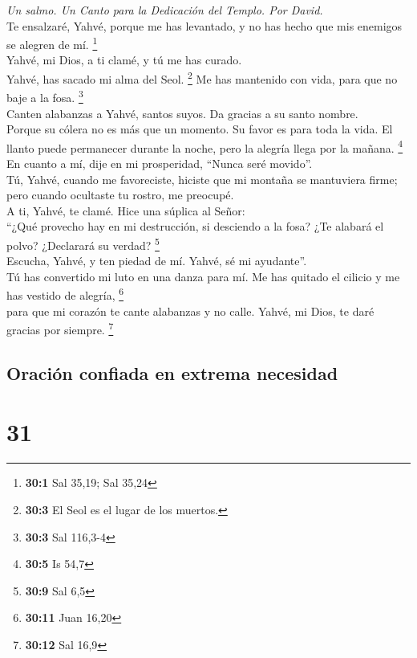 \emph{Un salmo. Un Canto para la Dedicación del Templo. Por David.}\\
 Te ensalzaré, Yahvé, porque me has levantado, y no has
hecho que mis enemigos se alegren de mí. \footnote{\textbf{30:1} Sal
  35,19; Sal 35,24}\\
 Yahvé, mi Dios, a ti clamé, y tú me has curado.\\
 Yahvé, has sacado mi alma del Seol. \footnote{\textbf{30:3}
  El Seol es el lugar de los muertos.} Me has mantenido con vida, para
que no baje a la fosa. \footnote{\textbf{30:3} Sal 116,3-4}\\
 Canten alabanzas a Yahvé, santos suyos. Da gracias a su
santo nombre.\\
 Porque su cólera no es más que un momento. Su favor es
para toda la vida. El llanto puede permanecer durante la noche, pero la
alegría llega por la mañana. \footnote{\textbf{30:5} Is 54,7}\\
 En cuanto a mí, dije en mi prosperidad, ``Nunca seré
movido''.\\
 Tú, Yahvé, cuando me favoreciste, hiciste que mi montaña
se mantuviera firme; pero cuando ocultaste tu rostro, me preocupé.\\
 A ti, Yahvé, te clamé. Hice una súplica al Señor:\\
 ``¿Qué provecho hay en mi destrucción, si desciendo a la
fosa? ¿Te alabará el polvo? ¿Declarará su verdad? \footnote{\textbf{30:9}
  Sal 6,5}\\
 Escucha, Yahvé, y ten piedad de mí. Yahvé, sé mi
ayudante''.\\
 Tú has convertido mi luto en una danza para mí. Me has
quitado el cilicio y me has vestido de alegría, \footnote{\textbf{30:11}
  Juan 16,20}\\
 para que mi corazón te cante alabanzas y no calle.
Yahvé, mi Dios, te daré gracias por siempre. \footnote{\textbf{30:12}
  Sal 16,9}

\hypertarget{oraciuxf3n-confiada-en-extrema-necesidad}{%
\subsection{Oración confiada en extrema
necesidad}\label{oraciuxf3n-confiada-en-extrema-necesidad}}

\hypertarget{section-30}{%
\section{31}\label{section-30}}

